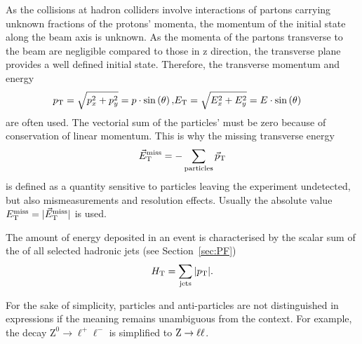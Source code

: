 As the collisions at hadron colliders involve interactions of partons carrying unknown fractions of the protons' momenta, the momentum of the initial state along the beam axis is unknown. As the momenta of the partons transverse to the beam are negligible compared to those in z direction, the transverse plane provides a well defined initial state. Therefore, the transverse momentum and energy
\begin{eqnarray}
p_{\mathrm{T}} = \sqrt{p_x^2  + p_y^2} = p\cdot \sin\left(\theta\right), & E_{\mathrm{T}} = \sqrt{E_x^2  + E_y^2} = E\cdot \sin\left(\theta\right)
\end{eqnarray}
are often used. The vectorial sum of the particles' \pt must be zero because of conservation of linear momentum. This is why the missing transverse energy 
\begin{equation}
\vec{E}_{\mathrm{T}}^{\mathrm{miss}} = - \sum\limits_{\text{particles}} \vec{p}_{\mathrm{T}}
\end{equation}
is defined as a quantity sensitive to particles leaving the experiment undetected, but also mismeasurements and resolution effects. Usually the absolute value $E_{\mathrm{T}}^{\mathrm{miss}} = \vert \vec{E}_{\mathrm{T}}^{\mathrm{miss}} \vert$ is used.

The amount of energy deposited in an event is characterised by the scalar sum of the \pt of all selected hadronic jets (see Section~\ref{sec:PF}) 
\begin{equation}
H_\mathrm{T} = \sum\limits_{\text{jets}} \vert p_{\mathrm{T}} \vert.
\end{equation}

For the sake of simplicity, particles and anti-particles are not distinguished in expressions if the meaning remains unambiguous from the context. For example, the decay $\mathrm{Z}^0 \rightarrow \ell^+\ell^-$ is simplified to $\mathrm{Z} \rightarrow \ell\ell$.
